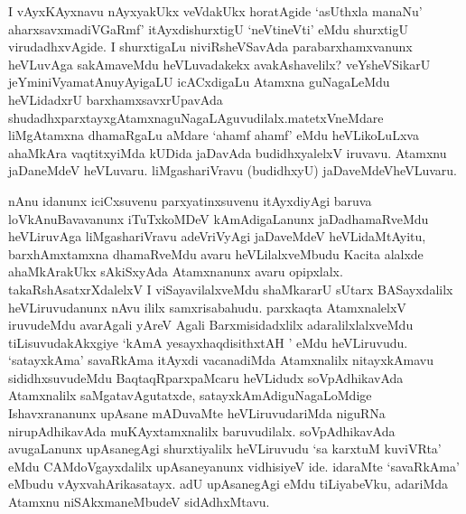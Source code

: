 
\begin{artha}
I vAyxKAyxnavu nAyxyakUkx veVdakUkx horatAgide `asUthxla manaNu' aharxsavxmadiVGaRmf' itAyxdishurxtigU  `neVtineVti' eMdu shurxtigU virudadhxvAgide. I shurxtigaLu niviRsheVSavAda parabarxhamxvanunx heVLuvAga sakAmaveMdu heVLuvadakekx avakAshavelilx? veYsheVSikarU jeYminiVyamatAnuyAyigaLU icACxdigaLu Atamxna guNagaLeMdu heVLidadxrU barxhamxsavxrUpavAda shudadhxparxtayxgAtamxnaguNagaLAguvudilalx.\break matetxVneMdare liMgAtamxna dhamaRgaLu aMdare `ahamf ahamf' eMdu heVLikoLuLxva ahaMkAra vaqtitxyiMda kUDida jaDavAda budidhxyalelxV iruvavu. Atamxnu jaDaneMdeV heVLuvaru. liMgashariVravu (budidhxyU) jaDaveMdeVheVLuvaru.
\end{artha}

\begin{artha}
nAnu idanunx iciCxsuvenu parxyatinxsuvenu itAyxdiyAgi baruva loVkAnuBavavanunx iTuTxkoMDeV kAmAdigaLanunx jaDadhamaRveMdu heVLiruvAga liMgashariVravu adeVriVyAgi jaDaveMdeV heVLi\-\break daMtAyitu, barxhAmxtamxna dhamaRveMdu avaru heVLilalxveMbudu Kacita alalxde ahaMkArakUkx sAkiSxyAda Atamxnanunx avaru opipxlalx. takaRshAsatxrXdalelxV I viSayavilalxveMdu shaMkararU sUtarx BASayxdalilx heVLiruvudanunx nAvu ililx samxrisabahudu. parxkaqta AtamxnalelxV iruvudeMdu avarAgali yAreV Agali Barxmisidadxlilx adaralilxlalxveMdu tiLisuvudakAkxgiye `kAmA ye\s sayxhaqdisithxtAH ' eMdu heVLiruvudu. `satayxkAma' savaRkAma itAyxdi vacanadiMda Atamxnalilx nitayxkAmavu sididhxsuvudeMdu BaqtaqRparxpaMcaru heVLidudx soVpAdhikavAda Atamxnalilx saMgatavAgutatxde, satayxkAmAdiguNagaLoMdige Ishavxrananunx upAsane mADuvaMte heVLiruvudariMda niguRNa nirupAdhikavAda muKAyxtamxnalilx baruvudilalx. soVpAdhikavAda avugaLanunx upAsanegAgi shurxtiyalilx heVLiruvudu `sa karxtuM kuviVRta' eMdu CAMdoVgayxdalilx upAsaneyanunx vidhisiyeV ide. idaraMte `savaRkAma' eMbudu vAyxvahArikasatayx. adU upAsanegAgi eMdu tiLiyabeVku, adariMda Atamxnu niSAkxmaneMbudeV sidAdhxMtavu.
\end{artha}

